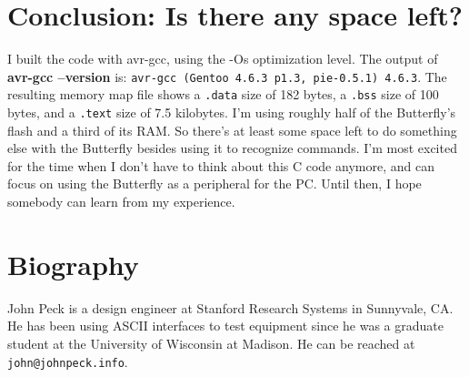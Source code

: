 \section{Conclusion: Is there any space left?}
I built the code with avr-gcc, using the -Os optimization level.  The output of \textbf{avr-gcc --version} is: \texttt{avr-gcc (Gentoo 4.6.3 p1.3, pie-0.5.1) 4.6.3}. The resulting memory map file shows a \texttt{.data} size of 182 bytes, a \texttt{.bss} size of 100 bytes, and a \texttt{.text} size of 7.5 kilobytes.  I'm using roughly half of the Butterfly's flash and a third of its RAM.  So there's at least some space left to do something else with the Butterfly besides using it to recognize commands.  I'm most excited for the time when I don't have to think about this C code anymore, and can focus on using the Butterfly as a peripheral for the PC.  Until then, I hope somebody can learn from my experience.

\section{Biography}
John Peck is a design engineer at Stanford Research Systems in Sunnyvale, CA.  He has been using ASCII interfaces to test equipment since he was a graduate student at the University of Wisconsin at Madison.  He can be reached at \texttt{john@johnpeck.info}.


\clearpage{}
\raggedright



